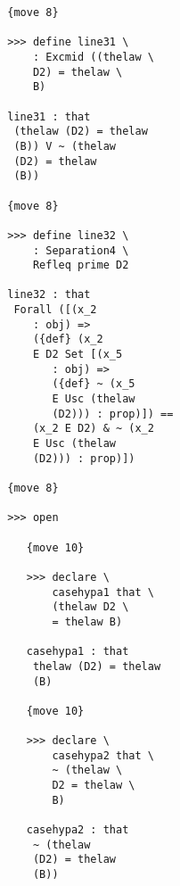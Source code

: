 \documentclass[12pt]{article}
\begin{document}
\begin{verbatim}
                           {move 8}

                           >>> define line31 \
                               : Excmid ((thelaw \
                               D2) = thelaw \
                               B)

                           line31 : that 
                            (thelaw (D2) = thelaw 
                            (B)) V ~ (thelaw 
                            (D2) = thelaw 
                            (B))

                           {move 8}

                           >>> define line32 \
                               : Separation4 \
                               Refleq prime D2

                           line32 : that 
                            Forall ([(x_2 
                               : obj) => 
                               ({def} (x_2 
                               E D2 Set [(x_5 
                                  : obj) => 
                                  ({def} ~ (x_5 
                                  E Usc (thelaw 
                                  (D2))) : prop)]) == 
                               (x_2 E D2) & ~ (x_2 
                               E Usc (thelaw 
                               (D2))) : prop)])

                           {move 8}

                           >>> open

                              {move 10}

                              >>> declare \
                                  casehypa1 that \
                                  (thelaw D2 \
                                  = thelaw B)

                              casehypa1 : that 
                               thelaw (D2) = thelaw 
                               (B)

                              {move 10}

                              >>> declare \
                                  casehypa2 that \
                                  ~ (thelaw \
                                  D2 = thelaw \
                                  B)

                              casehypa2 : that 
                               ~ (thelaw 
                               (D2) = thelaw 
                               (B))


\end{verbatim}
\end{document}
